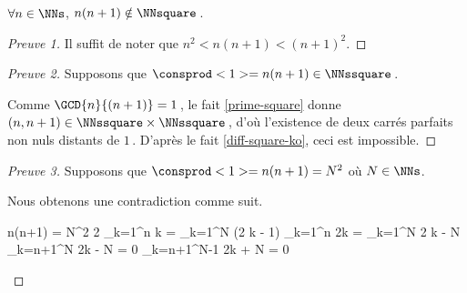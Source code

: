 \begin{fact} \label{case-2}
	 $\forall n \in \NNs$, $n(n+1) \notin \NNsquare$\,.
\end{fact}




\begin{proof}[Preuve 1]
	Il suffit de noter que $n^2 < n(n+1) < (n+1)^2$.
\end{proof}




\begin{proof}[Preuve 2]
    Supposons que $\consprod<1> = n(n+1) \in \NNssquare$\,.
    
    \smallskip
    
    Comme $\GCD{n}{(n + 1)} = 1$\,, le fait \ref{prime-square} donne $(n, n + 1) \in \NNssquare \times \NNssquare$\,, d'où l'existence de deux carrés parfaits non nuls distants de $1$\,.
    D'après le fait \ref{diff-square-ko}, ceci est impossible.
\end{proof}




\begin{proof}[Preuve 3]
	Supposons que $\consprod<1> = n(n+1) = N^2$ où $N \in \NNs$.
     
    \smallskip
    
    Nous obtenons une contradiction comme suit.
	
	\medskip
	
	\begin{stepcalc}[style = ar*, ope = \iff]
		n(n+1) = N^2
		2 \dsum_{k=1}^{n} k = \dsum_{k=1}^{N} (2 k - 1)
	\explnext{}
		\dsum_{k=1}^{n} 2k = \dsum_{k=1}^{N} 2 k - N
		\dsum_{k=n+1}^{N} 2k - N = 0
		\dsum_{k=n+1}^{N-1} 2k + N = 0
	\end{stepcalc}

	\vspace{-2ex}	
	\leavevmode
\end{proof}
